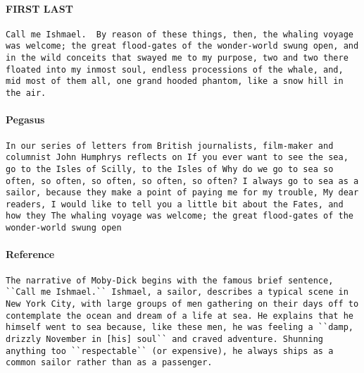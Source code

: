 \documentclass{article}
\begin{document}
\paragraph{FIRST LAST}
\begin{center}
\begin{lstlisting}
Call me Ishmael.  By reason of these things, then, the whaling voyage was welcome; the great flood-gates of the wonder-world swung open, and in the wild conceits that swayed me to my purpose, two and two there floated into my inmost soul, endless processions of the whale, and, mid most of them all, one grand hooded phantom, like a snow hill in the air.
\end{lstlisting}
\end{center}
\paragraph{Pegasus}
\begin{center}
\begin{lstlisting}
In our series of letters from British journalists, film-maker and columnist John Humphrys reflects on If you ever want to see the sea, go to the Isles of Scilly, to the Isles of Why do we go to sea so often, so often, so often, so often, so often? I always go to sea as a sailor, because they make a point of paying me for my trouble, My dear readers, I would like to tell you a little bit about the Fates, and how they The whaling voyage was welcome; the great flood-gates of the wonder-world swung open
\end{lstlisting}
\end{center}
\paragraph{Reference}
\begin{center}
\begin{lstlisting}
The narrative of Moby-Dick begins with the famous brief sentence, ``Call me Ishmael.`` Ishmael, a sailor, describes a typical scene in New York City, with large groups of men gathering on their days off to contemplate the ocean and dream of a life at sea. He explains that he himself went to sea because, like these men, he was feeling a ``damp, drizzly November in [his] soul`` and craved adventure. Shunning anything too ``respectable`` (or expensive), he always ships as a common sailor rather than as a passenger.
\end{lstlisting}
\end{center}





\end{document}
